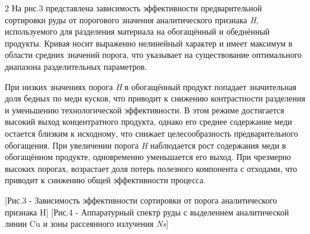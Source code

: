 \begin{multicols}{2}
На рис.3 представлена зависимость эффективности предварительной
сортировки руды от порогового значения аналитического признака \emph{H},
используемого для разделения материала на обогащённый и обеднённый
продукты. Кривая носит выраженно нелинейный характер и имеет максимум в
области средних значений порога, что указывает на существование
оптимального диапазона разделительных параметров.

При низких значениях порога \emph{H} в обогащённый продукт попадает
значительная доля бедных по меди кусков, что приводит к снижению
контрастности разделения и уменьшению технологической эффективности. В
этом режиме достигается высокий выход концентратного продукта, однако
его среднее содержание меди остается близким к исходному, что снижает
целесообразность предварительного обогащения. При увеличении порога
\emph{H} наблюдается рост содержания меди в обогащённом продукте,
одновременно уменьшается его выход. При чрезмерно высоких порогах,
возрастает доля потерь полезного компонента с отходами, что приводит к
снижению общей эффективности процесса.
\end{multicols}

\begin{figs}
    [Рис.3 - Зависимость эффективности сортировки от порога
аналитического признака H]
    [Рис.4 - Аппаратурный спектр руды с выделением аналитической
линии Cu и зоны рассеянного излучения \emph{Ns}]
\end{figs}

